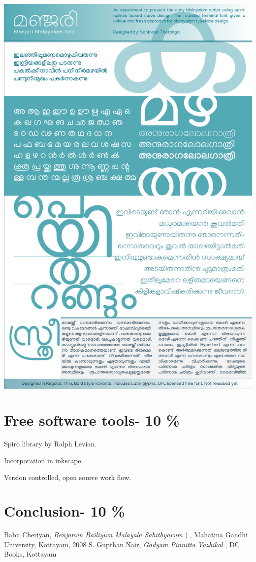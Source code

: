 \documentclass[10pt]{article}
\begin{document}
\includegraphics[width=\textwidth]{images/Manjari-Specimen.pdf}

\section{Free software tools- 10 \%}

Spiro library by Ralph Levian.

Incorporation in inkscape

Version controlled, open source work flow.

\section{Conclusion- 10 \%}

\begin{thebibliography}{99}
	 Babu Cheriyan, \textit{Benjamin Bailiyum Malayala Sahithyavum} {) }, Mahatma Gandhi University, Kottayam, 2008
	 S. Gupthan Nair, \textit{Gadyam Pinnitta Vazhikal}{ }, DC Books, Kottayam 

	
\end{thebibliography}
\end{document}
